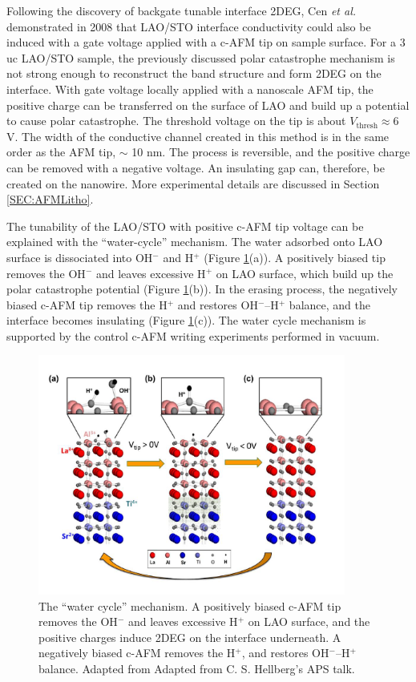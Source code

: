 \documentclass[pdflatex, sectionletters, 12pt]{pittetd}    %
\begin{document}
Following the discovery of backgate tunable interface 2DEG, Cen \textit{et al.}  demonstrated in 2008 that LAO/STO interface conductivity could also be induced with a gate voltage applied with a c-AFM tip on sample surface\cite{cen2008nanoscale}. For a 3 uc LAO/STO sample, the previously discussed polar catastrophe mechanism is not strong enough to reconstruct the band structure and form 2DEG on the interface. With gate voltage locally applied with a nanoscale AFM tip, the positive charge can be transferred on the surface of LAO and build up a potential to cause polar catastrophe. The threshold voltage on the tip is about $V_\mathrm{thresh} \approx 6$ V\cite{cen2008nanoscale}. The width of the conductive channel created in this method is in the same order as the AFM tip, $\sim$ 10 nm. The process is reversible, and the positive charge can be removed with a negative voltage. An insulating gap can, therefore, be created on the nanowire. More experimental details are discussed in Section \ref{SEC:AFMLitho}.

The tunability of the LAO/STO with positive c-AFM tip voltage can be explained with the ``water-cycle'' mechanism\cite{bi2010water}. The water adsorbed onto LAO surface is dissociated into OH$^{-}$ and H$^{+}$ (Figure \ref{FIG:WaterCycle}(a)). A positively biased tip removes the OH$^{-}$ and leaves excessive H$^{+}$ on LAO surface, which build up the polar catastrophe potential (Figure \ref{FIG:WaterCycle}(b)). In the erasing process, the negatively biased c-AFM tip removes the H$^{+}$ and restores OH$^{-}$--H$^{+}$ balance, and the interface becomes insulating (Figure \ref{FIG:WaterCycle}(c)). The water cycle mechanism is supported by the control c-AFM writing experiments performed in vacuum\cite{bi2010water}.

\begin{figure}[h!]
	\centering
	\includegraphics[width=0.9\textwidth]{Drawing/WaterCycle.png}
	\caption{The ``water cycle'' mechanism. A positively biased c-AFM tip removes the OH$^{-}$ and leaves excessive H$^{+}$ on LAO surface, and the positive charges induce 2DEG on the interface underneath. A negatively biased c-AFM removes the H$^{+}$, and restores OH$^{-}$--H$^{+}$ balance. Adapted from Adapted from C. S. Hellberg's APS talk.}
	\label{FIG:WaterCycle}
\end{figure}
\end{document}
